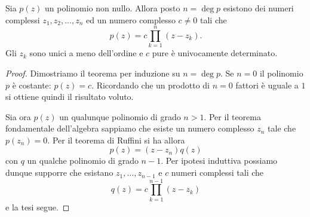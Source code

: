 \begin{theorem}
Sia $p(z)$ un polinomio non nullo. Allora posto $n=\deg p$ esistono dei numeri complessi $z_1, z_2, \dots, z_n$ ed un numero complesso $c\neq 0$ tali che
\[
  p(z) = c \prod_{k=1}^n (z-z_k).
\]
Gli $z_k$ sono unici a meno dell'ordine e $c$ pure è univocamente determinato.
\end{theorem}
%
\begin{proof}
Dimostriamo il teorema per induzione su $n=\deg p$. Se $n=0$ il polinomio $p$ è costante: $p(z) = c$. Ricordando che un prodotto di $n=0$ fattori è uguale a $1$ si ottiene quindi il risultato voluto.

Sia ora $p(z)$ un qualunque polinomio di grado $n>1$. Per il teorema fondamentale dell'algebra sappiamo che esiste un numero complesso $z_n$ tale che $p(z_n)=0$. Per il teorema di Ruffini si ha allora
\[
  p(z) = (z-z_n) q(z)
\]
con $q$ un qualche polinomio di grado $n-1$. Per ipotesi induttiva possiamo dunque supporre che esistano $z_1, \dots, z_{n-1}$ e $c$ numeri complessi tali che
\[
   q(z) = c \prod_{k=1}^{n-1} (z-z_k)
\]
e la tesi segue.
\end{proof}
